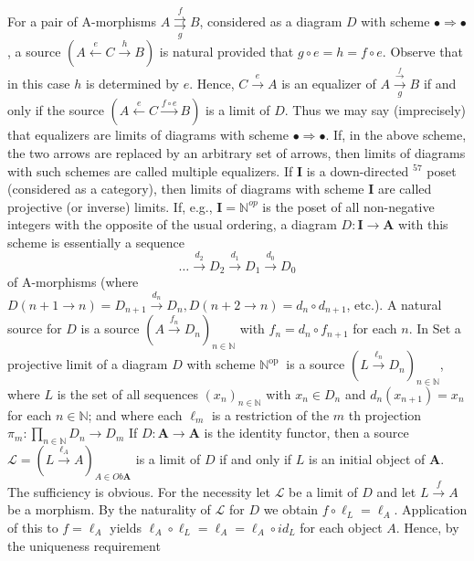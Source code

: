 \begin{enumerate}
    For a pair of A-morphisms $A \underset{g}{\stackrel{f}{\rightrightarrows}} B$, considered as a diagram $D$ with scheme $\bullet \Rightarrow \bullet$, a source $(A \stackrel{e}{\longleftarrow} C \xrightarrow{h} B)$ is natural provided that $g \circ e=h=f \circ e$. Observe that in this case $h$ is determined by $e$. Hence, $C \xrightarrow{e} A$ is an equalizer of $A \xrightarrow[g]{\stackrel{f}{\longrightarrow}} B$ if and only if the source $(A \stackrel{e}{\leftarrow} C \xrightarrow{f \circ e} B)$ is a limit of $D$. Thus we may say (imprecisely) that equalizers are limits of diagrams with scheme $\bullet \Rightarrow \bullet$. If, in the above scheme, the two arrows are replaced by an arbitrary set of arrows, then limits of diagrams with such schemes are called multiple equalizers.
    If $\mathbf{I}$ is a down-directed ${ }^{57}$ poset (considered as a category), then limits of diagrams with scheme $\mathbf{I}$ are called projective (or inverse) limits. If, e.g., $\mathbf{I}=\mathbb{N}^{o p}$ is the poset of all non-negative integers with the opposite of the usual ordering, a diagram $D: \mathbf{I} \rightarrow \mathbf{A}$ with this scheme is essentially a sequence
    $$
    \ldots \xrightarrow{d_2} D_2 \xrightarrow{d_1} D_1 \xrightarrow{d_0} D_0
    $$
    of A-morphisms (where $D(n+1 \rightarrow n)=D_{n+1} \xrightarrow{d_n} D_n, D(n+2 \rightarrow n)=d_n \circ d_{n+1}$, etc.). A natural source for $D$ is a source $\left(A \xrightarrow{f_n} D_n\right)_{n \in \mathbb{N}}$ with $f_n=d_n \circ f_{n+1}$ for each $n$. In Set a projective limit of a diagram $D$ with scheme $\mathbb{N}^{\text {op }}$ is a source $\left(L \xrightarrow{\ell_n} D_n\right)_{n \in \mathbb{N}}$, where $L$ is the set of all sequences $\left(x_n\right)_{n \in \mathbb{N}}$ with $x_n \in D_n$ and $d_n\left(x_{n+1}\right)=x_n$ for each $n \in \mathbb{N}$; and where each $\ell_m$ is a restriction of the $m$ th projection $\pi_m: \prod_{n \in \mathbb{N}} D_n \rightarrow D_m$
    If $D: \mathbf{A} \rightarrow \mathbf{A}$ is the identity functor, then a source $\mathcal{L}=\left(L \xrightarrow{\ell_A} A\right)_{A \in O b \mathbf{A}}$ is a limit of $D$ if and only if $L$ is an initial object of $\mathbf{A}$. The sufficiency is obvious. For the necessity let $\mathcal{L}$ be a limit of $D$ and let $L \xrightarrow{f} A$ be a morphism. By the naturality of $\mathcal{L}$ for $D$ we obtain $f \circ \ell_L=\ell_A$. Application of this to $f=\ell_A$ yields $\ell_A \circ \ell_L=\ell_A=\ell_A \circ i d_L$ for each object $A$. Hence, by the uniqueness requirement
\end{enumerate}



